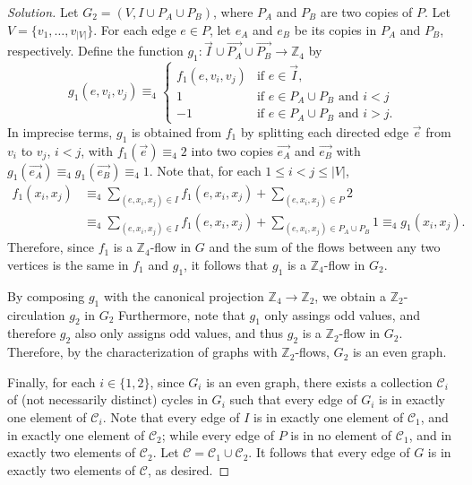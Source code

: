 \begin{proof}[Solution]
    Let \(G_2 = (V, I \cup P_A \cup P_B)\),
    where \(P_A\) and \(P_B\) are two copies of \(P\).
    Let \(V = \{ v_1, \ldots, v_{|V|} \}\).
    For each edge \(e \in P\), let \(e_A\) and \(e_B\) be its copies in \(P_A\) and \(P_B\), respectively.
    Define the function \(g_1 \colon \vec{I} \cup \vec{P_A} \cup \vec{P_B} \to \mathbb{Z}_4\) by
    \begin{equation*}
        g_1(e, v_i, v_j)
        \equiv_4
        \begin{cases}
            f_1(e, v_i, v_j) & \text{if } e \in \vec{I},                         \\
            1                & \text{if } e \in P_A \cup P_B \text{ and } i < j  \\
            -1               & \text{if } e \in P_A \cup P_B \text{ and } i > j.
        \end{cases}
    \end{equation*}
    In imprecise terms, \(g_1\) is obtained from \(f_1\) by splitting each directed edge \(\vec{e}\) from \(v_i\) to \(v_j\), \(i < j\), with \(f_1(\vec{e}) \equiv_4 2\) into two copies \(\vec{e_A}\) and \(\vec{e_B}\) with \(g_1(\vec{e_A}) \equiv_4 g_1(\vec{e_B}) \equiv_4 1\).
    Note that, for each \(1 \leq i < j \leq |V|\),
    \begin{align*}
        f_1(x_i, x_j)
         & \equiv_4 \sum_{(e, x_i, x_j) \in I} f_1(e, x_i, x_j) + \sum_{(e, x_i, x_j) \in P} 2            \\
         & \equiv_4 \sum_{(e, x_i, x_j) \in I} f_1(e, x_i, x_j) + \sum_{(e, x_i, x_j) \in P_A \cup P_B} 1
        \equiv_4 g_1(x_i, x_j).
    \end{align*}
    Therefore, since \(f_1\) is a \(\mathbb{Z}_4\)-flow in \(G\) and
    the sum of the flows between any two vertices is the same in \(f_1\) and \(g_1\),
    it follows that \(g_1\) is a \(\mathbb{Z}_4\)-flow in \(G_2\).

    By composing \(g_1\) with the canonical projection \(\mathbb{Z}_4 \to \mathbb{Z}_2\),
    we obtain a \(\mathbb{Z}_2\)-circulation \(g_2\) in \(G_2\)
    Furthermore, note that \(g_1\) only assings odd values,
    and therefore \(g_2\) also only assigns odd values,
    and thus \(g_2\) is a \(\mathbb{Z}_2\)-flow in \(G_2\).
    Therefore, by the characterization of graphs with \(\mathbb{Z}_2\)-flows,
    \(G_2\) is an even graph.

    Finally, for each \(i \in \{1, 2\}\),
    since \(G_i\) is an even graph,
    there exists a collection \(\mathcal{C}_i\) of (not necessarily distinct) cycles in \(G_i\) such that every edge of \(G_i\) is in exactly one element of \(\mathcal{C}_i\).
    Note that every edge of \(I\) is in exactly one element of \(\mathcal{C}_1\),
    and in exactly one element of \(\mathcal{C}_2\);
    while every edge of \(P\) is in no element of \(\mathcal{C}_1\),
    and in exactly two elements of \(\mathcal{C}_2\).
    Let \(\mathcal{C} = \mathcal{C}_1 \cup \mathcal{C}_2\).
    It follows that every edge of \(G\) is in exactly two elements of \(\mathcal{C}\), as desired.
\end{proof}

